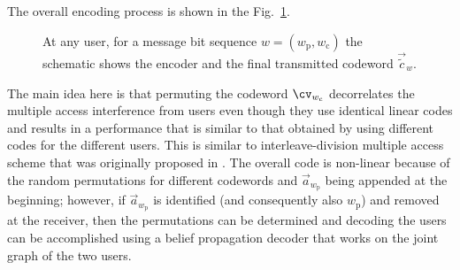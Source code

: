 \documentclass[final,onecolumn,12pt]{IEEEtran}
\newif\iflonger
\begin{document}
The overall encoding process is shown in the Fig.~\ref{fig:encodingscheme}.
\begin{figure}[h!]
  \centering
  \resizebox{0.55\textwidth}{!}{}
  \caption{At any user, for a message bit sequence  $w=(w_\mathrm{p},w_\mathrm{c})$ the schematic shows the encoder and the final transmitted codeword $\vec{\tilde{c}}_w$.}
  \label{fig:encodingscheme}
\end{figure}
The main idea here is that permuting the codeword $\cv_{w_\mathrm{c}}$ decorrelates the multiple access interference from users even though they use identical linear codes and results in a performance that is similar to that obtained by using different codes for the different users. This is similar to interleave-division multiple access scheme that was originally proposed in \cite{ping2006interleave}. The overall code is non-linear because of the random permutations for different codewords and $\vec{a}_{w_\mathrm{p}}$ being appended at the beginning; however, if $\vec{a}_{w_\mathrm{p}}$ is identified (and consequently also $w_\mathrm{p}$) and removed at the receiver, then the permutations can be determined and decoding the users  can be accomplished using a belief propagation decoder that works on the joint graph of the two users.
\iflonger
Several generalizations of this scheme are possible. It is possible to use different shifts of codeword instead of permutations of the codeword. We can also think of a more general scheme where the messages are binned in to $M_\mathrm{p}$ bins each with $M_1$ messages. Within each bin, the messages are encoded by a linear code and a permutation is chosen based on the bin index that the message falls in. In these cases, the $M_\mathrm{p}$ bits will have to be first conveyed through spreading sequences or shifts of a synchronization sequence. By choosing $M_\mathrm{p}$ to be fairly small, the complexity of demodulating/decoding these $M_\mathrm{p}$ bits can be kept to be fairly small. For clarity of exposition, we will use the shift based scheme in the rest of paper. In the special case when $V=1$ and we choose different interleavers or permutations of the code symbols, the proposed scheme becomes identical to interleave division multiple access (IDMA) \cite{ping2006interleave}. In this case, however, $M_\mathrm{p}$ will be reasonably large and efficient multi-user detection is needed to detect the $B_\mathrm{p}$ bits first. This will be considered in a future study.
\fi
\end{document}
